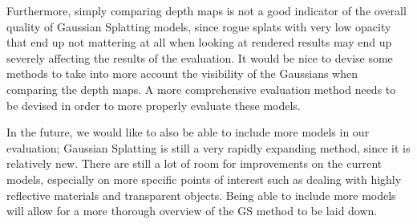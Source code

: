 Furthermore, simply comparing depth maps is not a good indicator of the overall quality of Gaussian Splatting models, since rogue splats with very low opacity that end up not mattering at all when looking at rendered results may end up severely affecting the results of the evaluation. It would be nice to devise some methods to take into more account the visibility of the Gaussians when comparing the depth maps. A more comprehensive evaluation method needs to be devised in order to more properly evaluate these models.

In the future, we would like to also be able to include more models in our evaluation; Gaussian Splatting is still a very rapidly expanding method, since it is relatively new. There are still a lot of room for improvements on the current models, especially on more specific points of interest such as dealing with highly reflective materials and transparent objects. Being able to include more models will allow for a more thorough overview of the GS method to be laid down. 